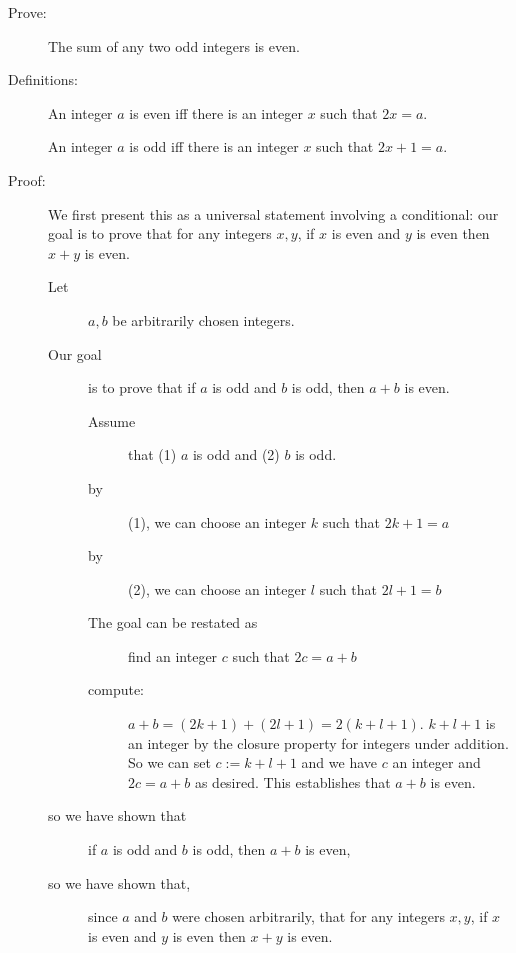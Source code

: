 \documentclass[12pt]{article}
\begin{document}
\begin{description}

\item[Prove:]  The sum of any two odd integers is even.

\item[Definitions:]  An integer $a$ is even iff there is an integer $x$ such that $2x=a$.

An integer $a$ is odd iff there is an integer $x$ such that $2x+1=a$.

\item [Proof:]  We first present this as a universal statement involving a conditional:  our goal is to prove that for any integers $x,y$, if $x$ is even and $y$ is even then $x+y$ is even.

\begin{description}

\item [Let] $a,b$ be arbitrarily chosen integers.  \item[Our goal] is to prove that if $a$ is odd and $b$ is odd, then $a+b$ is even.

\begin{description}

\item[Assume] that (1) $a$ is odd and (2) $b$ is odd.

\item[by] (1), we can choose an integer $k$ such that $2k+1=a$

\item[by] (2), we can choose an integer $l$ such that $2l+1=b$

\item[The goal can be restated as]  find an integer $c$ such that $2c=a+b$

\item[compute:]  $a+b = (2k+1) + (2l+1) = 2(k+l+1)$.  $k+l+1$ is an integer by the closure property for integers under addition.  So we can set $c:= k+l+1$ and we have $c$ an integer and $2c=a+b$ as desired.  This establishes that $a+b$ is even.

\end{description}

\item[so we have shown that]  if $a$ is odd and $b$ is odd, then $a+b$ is even,

\item[so we have shown that,] since $a$ and $b$ were chosen arbitrarily, that for any integers $x,y$, if $x$ is even and $y$ is even then $x+y$ is even.

\end{description}

\end{description}
\end{document}

